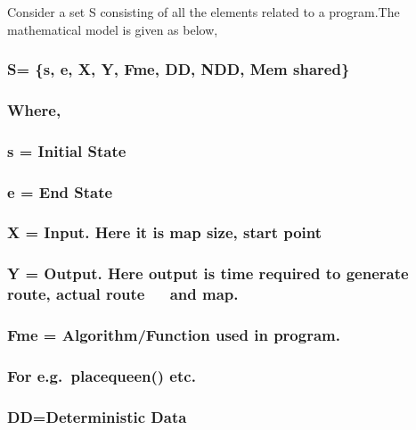 \documentclass[a4paper,12pt]{article}
\begin{document}
\begin{itemize}
\bigskip
\bigskip
\bigskip
\bigskip



\end{itemize}

\newpage
{}

{\ttfamily
\textrm{Consider a set S consisting of all the elements related to a program.The mathematical model is given as below,}}

\subsubsection[S= \{s, e, X, Y, Fme, DD, NDD, Mem shared\}]{\rmfamily S= \{s, e, X, Y, Fme, DD, NDD, Mem shared\}}
\subsubsection[Where,]{\rmfamily Where,}
\subsubsection[s = Initial State]{\rmfamily s = Initial State}
\subsubsection[e = End State]{\rmfamily e = End State}
\subsubsection[X = Input. Here it is map size, start point]{\rmfamily X = Input. Here it is map size, start
point}
\subsubsection[Y = Output. Here output is time required to generate route, actual route\ \ \ and map.]{\rmfamily Y =
Output. Here output is time required to generate route, actual route\ \ \ and map.}
\subsubsection[Fme = Algorithm/Function used in program.\ ]{\rmfamily Fme = Algorithm/Function used in program.\ }
\subsubsection[For e.g.\ placequeen() etc.]{\textmd{For e.g.}\ \textmd{placequeen() etc.}}
\subsubsection[DD=Deterministic Data]{\rmfamily DD=Deterministic Data}
\end{document}
